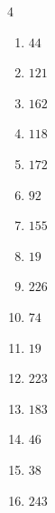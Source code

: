 \begin{multicols}{4}
\begin{enumerate}
  \item $44$


  \item $121$


\columnbreak %

  \item $162$


  \item $118$


  \item $172$


  \item $92$


  \item $155$


  \item $19$


  \item $226$


  \item $74$


  \item $19$


  \item $223$


  \item $183$


  \item $46$


  \item $38$


  \item $243$


\end{enumerate}
\end{multicols}
